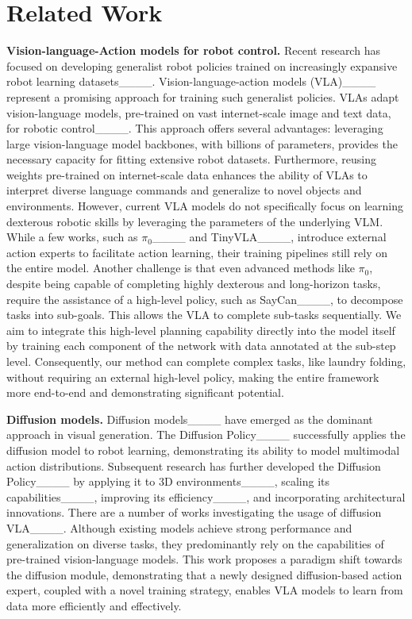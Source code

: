 \section{Related Work}
\textbf{Vision-language-Action models for robot control.} Recent research has focused on developing generalist robot policies trained on increasingly expansive robot learning datasets____. Vision-language-action models (VLA)____ represent a promising approach for training such generalist policies. VLAs adapt vision-language models, pre-trained on vast internet-scale image and text data, for robotic control____. This approach offers several advantages: leveraging large vision-language model backbones, with billions of parameters, provides the necessary capacity for fitting extensive robot datasets. Furthermore, reusing weights pre-trained on internet-scale data enhances the ability of VLAs to interpret diverse language commands and generalize to novel objects and environments. However, current VLA models do not specifically focus on learning dexterous robotic skills by leveraging the parameters of the underlying VLM. While a few works, such as $\pi_{0}$____ and TinyVLA____, introduce external action experts to facilitate action learning, their training pipelines still rely on the entire model. Another challenge is that even advanced methods like $\pi_{0}$, despite being capable of completing highly dexterous and long-horizon tasks, require the assistance of a high-level policy, such as SayCan____, to decompose tasks into sub-goals. This allows the VLA to complete sub-tasks sequentially. We aim to integrate this high-level planning capability directly into the model itself by training each component of the network with data annotated at the sub-step level. Consequently, our method can complete complex tasks, like laundry folding, without requiring an external high-level policy, making the entire framework more end-to-end and demonstrating significant potential.

\textbf{Diffusion models.} Diffusion models____ have emerged as the dominant approach in visual generation. The Diffusion Policy____ successfully applies the diffusion model to robot learning, demonstrating its ability to model multimodal action distributions. Subsequent research has further developed the Diffusion Policy____ by applying it to 3D environments____, scaling its capabilities____, improving its efficiency____, and incorporating architectural innovations. There are a number of works investigating the usage of diffusion VLA____. Although existing models achieve strong performance and generalization on diverse tasks, they predominantly rely on the capabilities of pre-trained vision-language models. This work proposes a paradigm shift towards the diffusion module, demonstrating that a newly designed diffusion-based action expert, coupled with a novel training strategy, enables VLA models to learn from data more efficiently and effectively.
